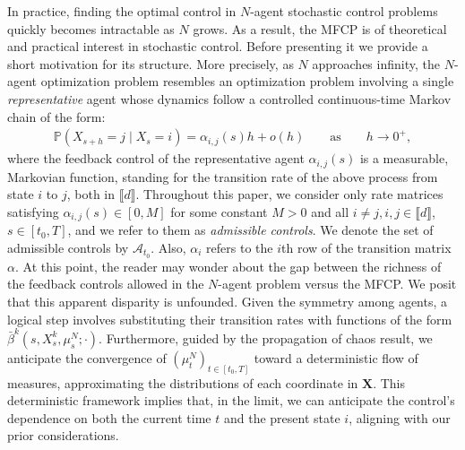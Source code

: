 \documentclass[11pt,reqno]{amsart}
\numberwithin{equation}{section}
\theoremstyle{plain}
\renewcommand{\P}{\mathbb{P}}
\newcommand{\lbrs}[1]{\llbracket #1 \rrbracket}
\begin{document}
In practice, finding the optimal control in $N$-agent stochastic control problems quickly becomes intractable as $N$ grows. As a result, the MFCP is of theoretical and practical interest in stochastic control. Before presenting it we provide a short motivation for its structure. More precisely, as $N$ approaches infinity, the $N$-agent optimization problem resembles an optimization problem involving a single {\it representative} agent whose dynamics follow a controlled continuous-time Markov chain of the form:
\begin{align}
\label{eq:mfcp-process}
    \P(X_{s+h} = j \mid X_s = i) = \alpha_{i,j}(s) h + o(h)\qquad\text{as}\qquad h\to0^+,
\end{align}
where the feedback control of the representative agent $\alpha_{i,j}(s)$ is a measurable, Markovian function, standing for the transition rate of the above process from state $i$ to $j$, both in $\lbrs{d}$.
Throughout this paper, we consider only rate matrices satisfying $\alpha_{i,j}(s) \in [0, M]$ for some constant $M > 0$ and all $i\ne j, i,j \in\lbrs{d}$, $s\in[t_0,T]$, and we refer to them as {\it admissible controls}. We denote the set of admissible controls by $\mathcal{A}_{t_0}$. Also, $\alpha_i$ refers to the $i$th row of the transition matrix $\alpha$. 
At this point, the reader may wonder about the gap between the richness of the feedback controls allowed in the $N$-agent problem versus the MFCP. We posit that this apparent disparity is unfounded. Given the symmetry among agents, a logical step involves substituting their transition rates with functions of the form $\bar \beta^k(s,X^k_s,\mu^N_s;\cdot)$. Furthermore, guided by the propagation of chaos result, we anticipate the convergence of $(\mu^N_t)_{t\in [t_0,T]}$ toward a deterministic flow of measures, approximating the distributions of each coordinate in $\mathbf{X}$. This deterministic framework implies that, in the limit, we can anticipate the control's dependence on both the current time $t$ and the present state $i$, aligning with our prior considerations.
\end{document}
